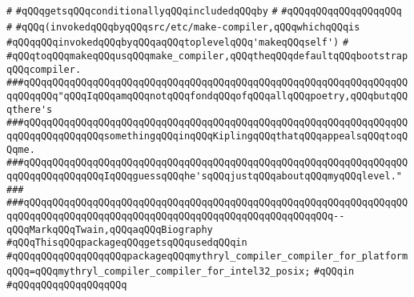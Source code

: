 \verb|#|\newline
\verb|#qQQqgetsqQQqconditionallyqQQqincludedqQQqby|\newline
\verb|#|\newline
\verb|#qQQqqQQqqQQqqQQqqQQq|\newline
\verb|#|\newline
\verb|#qQQq(invokedqQQqbyqQQqsrc/etc/make-compiler,qQQqwhichqQQqis|\newline
\verb|#qQQqqQQqinvokedqQQqbyqQQqaqQQqtoplevelqQQq'makeqQQqself')|\newline
\verb|#|\newline
\verb|#qQQqtoqQQqmakeqQQqusqQQqmake_compiler,qQQqtheqQQqdefaultqQQqbootstrapqQQqcompiler.|\newline
\newline
\newline
\newline
\verb|###qQQqqQQqqQQqqQQqqQQqqQQqqQQqqQQqqQQqqQQqqQQqqQQqqQQqqQQqqQQqqQQqqQQqqQQqqQQq"qQQqIqQQqamqQQqnotqQQqfondqQQqofqQQqallqQQqpoetry,qQQqbutqQQqthere's|\newline
\verb|###qQQqqQQqqQQqqQQqqQQqqQQqqQQqqQQqqQQqqQQqqQQqqQQqqQQqqQQqqQQqqQQqqQQqqQQqqQQqqQQqqQQqsomethingqQQqinqQQqKiplingqQQqthatqQQqappealsqQQqtoqQQqme.|\newline
\verb|###qQQqqQQqqQQqqQQqqQQqqQQqqQQqqQQqqQQqqQQqqQQqqQQqqQQqqQQqqQQqqQQqqQQqqQQqqQQqqQQqqQQqIqQQqguessqQQqhe'sqQQqjustqQQqaboutqQQqmyqQQqlevel."|\newline
\verb|###|\newline
\verb|###qQQqqQQqqQQqqQQqqQQqqQQqqQQqqQQqqQQqqQQqqQQqqQQqqQQqqQQqqQQqqQQqqQQqqQQqqQQqqQQqqQQqqQQqqQQqqQQqqQQqqQQqqQQqqQQqqQQqqQQqqQQq--qQQqMarkqQQqTwain,qQQqaqQQqBiography|\newline
\newline
\newline
\newline
\verb|#qQQqThisqQQqpackageqQQqgetsqQQqusedqQQqin|\newline
\verb|#qQQqqQQqqQQqqQQqqQQqpackageqQQqmythryl_compiler_compiler_for_platformqQQq=qQQqmythryl_compiler_compiler_for_intel32_posix;|\newline
\verb|#qQQqin|\newline
\verb|#qQQqqQQqqQQqqQQqqQQq|\newline
